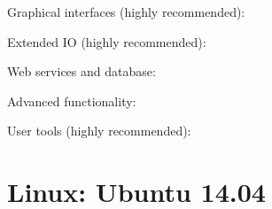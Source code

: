 \documentclass[letterpaper,10pt,english]{sphinxmanual}
\begin{document}
\sphinxAtStartPar
Graphical interfaces (highly recommended):

\begin{sphinxVerbatim}[commandchars=\\\{\}]
     
\end{sphinxVerbatim}

\sphinxAtStartPar
Extended IO (highly recommended):

\begin{sphinxVerbatim}[commandchars=\\\{\}]
     
\end{sphinxVerbatim}

\sphinxAtStartPar
Web services and database:

\begin{sphinxVerbatim}[commandchars=\\\{\}]
    
\end{sphinxVerbatim}

\sphinxAtStartPar
Advanced functionality:

\begin{sphinxVerbatim}[commandchars=\\\{\}]
     
\end{sphinxVerbatim}

\sphinxAtStartPar
User tools (highly recommended):

\begin{sphinxVerbatim}[commandchars=\\\{\}]
     
\end{sphinxVerbatim}


\section{Linux: Ubuntu 14.04}
\label{\detokenize{install_doc:linux-ubuntu-14-04}}
\end{document}

